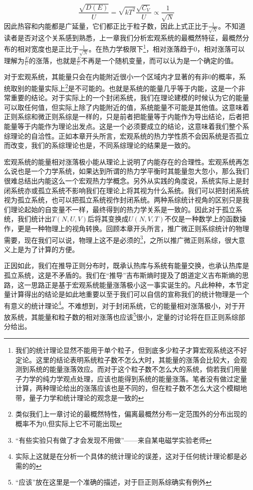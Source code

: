 \documentclass[../../main.tex]{subfiles}
\begin{document}
\begin{equation}
    \frac{\sqrt{D(E)}}{U}=\sqrt{kT^2}\frac{\sqrt{C_V}}{U}\propto \frac{1}{\sqrt{N}}
\end{equation}
因此热容和内能都是广延量，它们都正比于粒子数，因此上式正比于\(\frac{1}{\sqrt{N}}\)。不知道读者是否对这个关系感到熟悉，上一章我们分析宏观系统的最概然特征，最概然分布的相对宽度也是正比于\(\frac{1}{\sqrt{N}}\)。在热力学极限下\footnote{我们的统计理论显然不能用于单个粒子，但到底多少粒子才算宏观系统这不好定论。这里的结论表明系统粒子数不怎么大时，其能量的涨落会比较大，会观测到系统的能量涨落效应。而对于这个粒子数不怎么大的系统，倘若我们用量子力学的纯力学观点处理，应该也能得到系统的能量涨落。笔者没有做过定量计算，两种理论给出的涨落应该也是不同的，但在粒子数不怎么大这个模糊地带，量子力学和统计理论的观念是一致的}，相对涨落趋于0，相对涨落可以理解为\(\frac{E}{U}\)的涨落，也就是\(\frac{E}{U}\)不再是一个随机变量，而可以认为是一个确定的值。

对于宏观系统，其能量只会在内能附近很小一个区域内才显著的有非0的概率，系统取别的能量实际上\footnote{类似我们上一章讨论的最概然特性，偏离最概然分布一定范围外的分布出现的概率不为0,但实际上它不可能出现}是不可能的。也就是系统的能量几乎等于内能，这是一个非常重要的结论。对于实际上的一个封闭系统，我们在理论建模的时候认为它的能量可以取任何值，但实际上除了内能附近的值，系统能量不可能是其他值。这意味着正则系综和微正则系综是一样的，只是前者把能量等于内能作为导出结论，后者把能量等于内能作为理论出发点。这是一个必须要成立的结论，这意味着我们整个系综理论的自洽性。正如本章开头所言，宏观系统的热力学性质不会因系统是否孤立而改变，我们的系综理论也是，不同系综理论的结果是一致的。

宏观系统的能量相对涨落极小能从理论上说明了内能存在的合理性。宏观系统再怎么说也是一个力学系统，如果达到所谓的热力学平衡时其能量忽大忽小，那么我们很难总结出内能这么一个宏观热力学概念。另外从实践的角度说，系统实际上是封闭系统亦或孤立系统不影响我们在理论上将其视为什么系统。我们可以把封闭系统视为孤立系统，也可以把孤立系统视作封闭系统。两种系综统计视角的区别只是我们理论起始的自变量不一样，最终得到的热力学关系是一致的。因此对于孤立系统，我们统计出\(T(N,U,V)\)后将其变换成\(U(N,V,T)\)不仅是一种数学上的函数操作，更是一种物理上的视角转换。回顾本章开头所言，推广微正则系综统计的物理需要，现在我们可以说，物理上这不是必须的\footnote{“有些实验只有做了才会发现不用做”——来自某电磁学实验老师}，之所以推广微正则系综，很大意义上是为了计算的方便。

正因如此，我们在推导正则分布时，既承认热库与系统有能量交换，也承认热库是孤立系统，这是不矛盾的。我们在“推导”吉布斯熵时提及了朗道定义吉布斯熵的思路，这一思路正是基于宏观系统能量涨落极小这一事实诞生的。凡此种种，本节定量计算得出的结论是如此地重要以至于我们可以自信的宣称我们的统计物理是一个有意义的统计理论\footnote{实际上这就是在分析一个具体的统计理论的误差，这对于任何统计理论都是必需的的}。不难想到，对于封闭系统，它的能量相对涨落极小，对于开放系统，其能量和粒子数的相对涨落也应该\footnote{“应该”放在这里是一个准确的描述，对于巨正则系综确实有例外}很小，定量的讨论将在巨正则系综部分给出。
\end{document}
